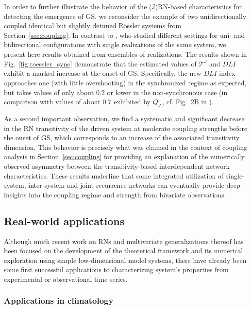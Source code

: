 \documentclass[graybox]{svmult}
\begin{document}
In order to further illustrate the behavior of the (J)RN-based characteristics for detecting the emergence of GS, we reconsider the example of two unidirectionally coupled identical but slightly detuned R\"ossler systems from Section~\ref{sec:coupling}. In contrast to \cite{Feldhoff2013}, who studied different settings for uni- and bidirectional configurations with single realizations of the same system, we present here results obtained from ensembles of realizations. The results shown in Fig.~\ref{fig:roessler_sync} demonstrate that the estimated values of $\mathcal{T}^J$ and $\widetilde{DLI}$ exhibit a marked increase at the onset of GS. Specifically, the new $DLI$ index approaches one (with little overshooting) in the synchronized regime as expected, but takes values of only about $0.2$ or lower in the non-synchronous case (in comparison with values of about $0.7$ exhibited by $Q_{\mathcal{T}}$, cf. Fig.~2B in \cite{Feldhoff2013}). 

As a second important observation, we find a systematic and significant decrease in the RN transitivity of the driven system at moderate coupling strengths before the onset of GS, which corresponds to an increase of the associated transitivity dimension. This behavior is precisely what was claimed in the context of coupling analysis in Section~\ref{sec:coupling} for providing an explanation of the numerically observed asymmetry between the transitivity-based interdependent network characteristics. These results underline that some integrated utilization of single-system, inter-system and joint recurrence networks can eventually provide deep insights into the coupling regime and strength from bivariate observations.


\subsection{Real-world applications}

Although much recent work on RNs and multivariate generalizations thereof has been focused on the development of the theoretical framework and its numerical exploration using simple low-dimensional model systems, there have already been some first successful applications to characterizing system's properties from experimental or observational time series.


\subsubsection{Applications in climatology}
\end{document}
